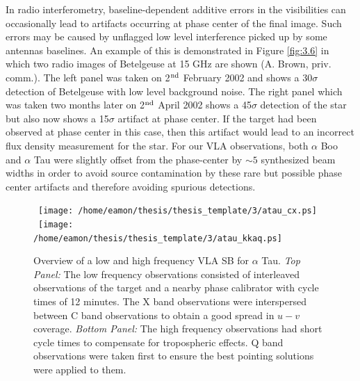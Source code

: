 In radio interferometry, baseline-dependent additive errors in the visibilities can occasionally lead to artifacts occurring at phase center of the final image. Such errors may be caused by unflagged low level interference picked up by some antennas baselines. An example of this is demonstrated in Figure \ref{fig:3.6} in which two radio images of Betelgeuse at 15 GHz are shown (A. Brown, priv. comm.). The left panel was taken on 2$^{\rm{nd}}$ February 2002 and shows a 30$\sigma$ detection of Betelgeuse with low level background noise. The right panel which was taken two months later on 2$^{\rm{nd}}$ April 2002 shows a 45$\sigma$ detection of the star but also now shows a 15$\sigma$ artifact at phase center. If the target had been observed at phase center in this case, then this artifact would lead to an incorrect flux density measurement for the star. For our VLA observations, both $\alpha$ Boo and $\alpha$ Tau were slightly offset from the phase-center by $\sim 5$ synthesized beam widths in order to avoid source contamination by these rare but possible phase center artifacts and therefore avoiding spurious detections. 

\begin{figure}[ht!]
\centering 
\mbox{
          \texttt{[image: /home/eamon/thesis/thesis\_template/3/atau\_cx.ps]}}
\mbox{
          \texttt{[image: /home/eamon/thesis/thesis\_template/3/atau\_kkaq.ps]}
          }
\caption[Overview of a low and high frequency VLA observation.]{Overview of a low and high frequency VLA SB for $\alpha$ Tau. \textit{Top Panel:} The low frequency observations consisted of interleaved
observations of the target and a nearby phase calibrator with cycle times of 12 minutes. The X band observations were interspersed between C band observations to obtain a good spread in $u-v$ coverage. \textit{Bottom Panel:} The high frequency observations had short cycle times to compensate for tropospheric effects. Q band observations were taken first to ensure the best pointing solutions were applied to them. }
\label{fig:3.7}
\end{figure}

